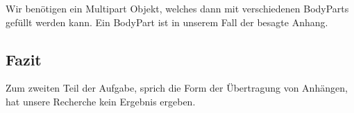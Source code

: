 Wir benötigen ein Multipart Objekt, welches dann mit verschiedenen BodyParts gefüllt werden kann. Ein BodyPart ist in unserem Fall der besagte Anhang.

\subsection{Fazit}
Zum zweiten Teil der Aufgabe, sprich die Form der Übertragung von Anhängen, hat unsere Recherche kein Ergebnis ergeben.